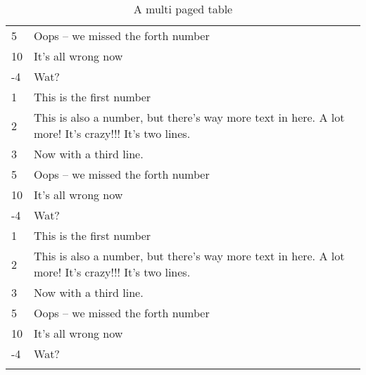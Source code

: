 \begin{longtable}{p{} p{}}
5 & Oops -- we missed the forth number \\
10 & It's all wrong now \\
-4 & Wat? \\ \hline
	1 & This is the first number \\
2 & This is also a number, but there's way more text in here. A lot more! It's crazy!!! It's two lines. \\
3 & Now with a third line. \\
5 & Oops -- we missed the forth number \\
10 & It's all wrong now \\
-4 & Wat? \\ \hline
	1 & This is the first number \\
2 & This is also a number, but there's way more text in here. A lot more! It's crazy!!! It's two lines. \\
3 & Now with a third line. \\
5 & Oops -- we missed the forth number \\
10 & It's all wrong now \\
-4 & Wat? \\ \hline

\caption{A multi paged table}
\label{tab:long}
\end{longtable}
